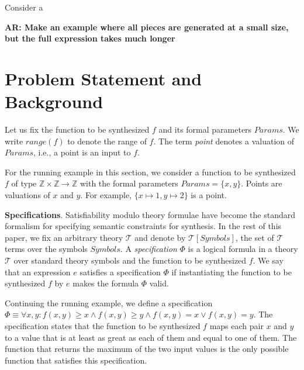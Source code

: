 \documentclass{llncs}
\newcommand\arsays[1]{{\bf AR: #1}}
\newcommand\Integers{\mathbb{Z}}
\newcommand\Expr{e}
\newcommand\Spec{\Phi}
\newcommand\SynthFun{f}
\newcommand\range{\mathit{range}}
\newcommand\FormalParameters{\mathit{Params}}
\newcommand\Symbols{\mathit{Symbols}}
\newcommand\Theory{\mathcal{T}}
\renewcommand{\paragraph}[1]{\par\noindent\textbf{#1}.}
\begin{document}
Consider a

\arsays{Make an example where all pieces are generated at a small size,
but the full expression takes much longer}


\section{Problem Statement and Background}
\label{sec:problem}

Let us fix the function to be synthesized $\SynthFun$ and its formal
parameters $\FormalParameters$.
We write $\range(\SynthFun)$ to denote the range of $\SynthFun$.
The term {\em point} denotes a valuation of $\FormalParameters$, i.e., a
point is an input to $\SynthFun$.

\begin{example}
  For the running example in this section, we consider a function to be
  synthesized $\SynthFun$ of type $\Integers \times \Integers \to
  \Integers$ with the formal parameters $\FormalParameters = \{ x, y \}$.
  Points are valuations of $x$ and $y$.
  For example, $\{ x \mapsto 1, y \mapsto 2 \}$ is a point.
\end{example}

\paragraph{Specifications}
Satisfiability modulo theory formulae have become the standard formalism
for specifying semantic constraints for synthesis.
In the rest of this paper, we fix an arbitrary theory $\Theory$ and
denote by $\Theory[\Symbols]$, the set of $\Theory$ terms over the
symbols $\Symbols$.
A {\em specification} $\Spec$ is a logical formula in a theory $\Theory$
over standard theory symbols and the function to be synthesized
$\SynthFun$.
We say that an expression $\Expr$ satisfies a specification $\Spec$ if
instantiating the function to be synthesized $\SynthFun$ by $\Expr$
makes the formula $\Spec$ valid.

\begin{example}
  \label{ex:running:spec}
  Continuing the running example, we define a specification $\Spec
  \equiv \forall x, y : \SynthFun(x, y) \geq x \wedge \SynthFun(x, y)
  \geq y \wedge f(x, y) = x \vee f(x, y) = y$.
  The specification states that the function to be synthesized
  $\SynthFun$ maps each pair $x$ and $y$ to a value that is at least as
  great as each of them and equal to one of them.
  The function that returns the maximum of the two input values is the
  only possible function that satisfies this specification.
\end{example}
\end{document}
